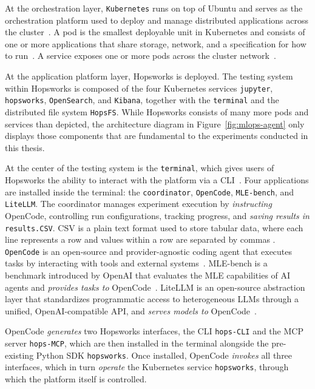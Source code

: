\documentclass[
english,                 %
bibtex,                  %
includeExtraAbstracts, %
]{kththesis}
\numberwithin{listing}{chapter}
\begin{document}
At the orchestration layer, \texttt{Kubernetes} runs on top of Ubuntu and serves as the orchestration platform used to deploy and manage distributed applications across the cluster~\cite{the_kubernetes_authors_kuberneteskubernetes_2026}. A pod is the smallest deployable unit in Kubernetes and consists of one or more applications that share storage, network, and a specification for how to run~\cite{the_kubernetes_authors_pods_2026}. A service exposes one or more pods across the cluster network~\cite{the_kubernetes_authors_service_2026}.

At the application platform layer, Hopsworks is deployed. The testing system within Hopsworks is composed of the four Kubernetes services \texttt{jupyter}, \texttt{hopsworks}, \texttt{OpenSearch}, and \texttt{Kibana}, together with the \texttt{terminal} and the distributed file system \texttt{HopsFS}. While Hopsworks consists of many more pods and services than depicted, the architecture diagram in Figure~\ref{fig:mlops-agent} only displays those components that are fundamental to the experiments conducted in this thesis.

At the center of the testing system is the \texttt{terminal}, which gives users of Hopsworks the ability to interact with the platform via a \gls{CLI}~\cite{hopsworks_ab_machine_2026, hopsworks_ab_build_2026}. Four applications are installed inside the terminal: the \texttt{coordinator}, \texttt{OpenCode}, \texttt{MLE-bench}, and \texttt{LiteLLM}. The coordinator manages experiment execution by \emph{instructing} OpenCode, controlling run configurations, tracking progress, and \emph{saving results in} \texttt{results.\gls{CSV}}. \gls{CSV} is a plain text format used to store tabular data, where each line represents a row and values within a row are separated by commas \cite{shafranovich_common_2005}. \texttt{OpenCode} is an open-source and provider-agnostic coding agent that executes tasks by interacting with tools and external systems~\cite{anomaly_innovations_inc_anomalycoopencode_2026}. \gls{MLE}-bench is a benchmark introduced by Open\Gls{AI} that evaluates the \gls{MLE} capabilities of \gls{AI} agents and \emph{provides tasks to} OpenCode~\cite{chan_mle-bench_2025}. Lite\gls{LLM} is an open-source abstraction layer that standardizes programmatic access to heterogeneous \glspl{LLM} through a unified, Open\Gls{AI}-compatible \gls{API}, and \emph{serves models to} OpenCode~\cite{litellm_berriailitellm_2026}.

OpenCode \emph{generates} two Hopsworks interfaces, the \gls{CLI} \texttt{hops-CLI} and the \gls{MCP} server \texttt{hops-MCP}, which are then installed in the terminal alongside the pre-existing Python \gls{SDK} \texttt{hopsworks}. Once installed, OpenCode \emph{invokes} all three interfaces, which in turn \emph{operate} the Kubernetes service \texttt{hopsworks}, through which the platform itself is controlled.
\end{document}
